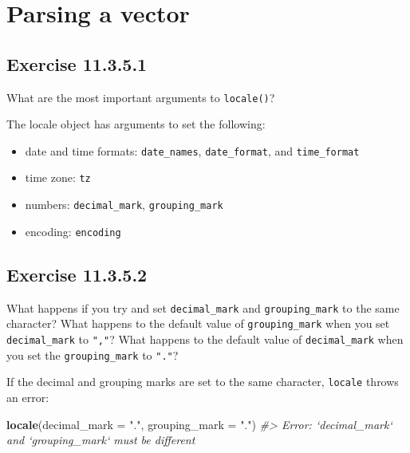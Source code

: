 \documentclass[]{book}
\newenvironment{Shaded}{\begin{snugshade}}{\end{snugshade}}
\newcommand{\CommentTok}[1]{\textcolor[rgb]{0.56,0.35,0.01}{\textit{#1}}}
\newcommand{\DataTypeTok}[1]{\textcolor[rgb]{0.13,0.29,0.53}{#1}}
\newcommand{\KeywordTok}[1]{\textcolor[rgb]{0.13,0.29,0.53}{\textbf{#1}}}
\newcommand{\NormalTok}[1]{#1}
\newcommand{\StringTok}[1]{\textcolor[rgb]{0.31,0.60,0.02}{#1}}
\providecommand{\tightlist}{%
  \setlength{\itemsep}{0pt}\setlength{\parskip}{0pt}}
\theoremstyle{plain}
\theoremstyle{remark}
\begin{document}
\hypertarget{parsing-a-vector}{%
\section{Parsing a vector}\label{parsing-a-vector}}

\hypertarget{exercise-11.3.5.1}{%
\subsection*{\texorpdfstring{Exercise
{11.3.5.1}}{Exercise 11.3.5.1}}\label{exercise-11.3.5.1}}

What are the most important arguments to \texttt{locale()}?

The locale object has arguments to set the following:

\begin{itemize}
\tightlist
\item
  date and time formats: \texttt{date\_names}, \texttt{date\_format},
  and \texttt{time\_format}
\item
  time zone: \texttt{tz}
\item
  numbers: \texttt{decimal\_mark}, \texttt{grouping\_mark}
\item
  encoding: \texttt{encoding}
\end{itemize}

\hypertarget{exercise-11.3.5.2}{%
\subsection*{\texorpdfstring{Exercise
{11.3.5.2}}{Exercise 11.3.5.2}}\label{exercise-11.3.5.2}}

What happens if you try and set \texttt{decimal\_mark} and
\texttt{grouping\_mark} to the same character? What happens to the
default value of \texttt{grouping\_mark} when you set
\texttt{decimal\_mark} to \texttt{","}? What happens to the default
value of \texttt{decimal\_mark} when you set the \texttt{grouping\_mark}
to \texttt{"."}?

If the decimal and grouping marks are set to the same character,
\texttt{locale} throws an error:

\begin{Shaded}
\begin{Highlighting}[]
\KeywordTok{locale}\NormalTok{(}\DataTypeTok{decimal_mark =} \StringTok{"."}\NormalTok{, }\DataTypeTok{grouping_mark =} \StringTok{"."}\NormalTok{)}
\CommentTok{#> Error: `decimal_mark` and `grouping_mark` must be different}
\end{Highlighting}
\end{Shaded}
\end{document}
